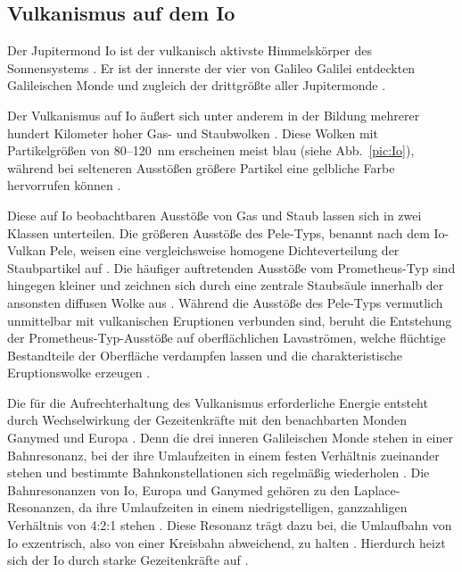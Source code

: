 \documentclass[a4paper,11pt]{article}
\newcommand{\mysubsection}[1]{\subsection{#1}\label{subsec:#1}}
\begin{document}
\mysubsection{Vulkanismus auf dem Io}

Der Jupitermond Io ist der vulkanisch aktivste Himmelskörper des Sonnensystems \parencite[1]{Prajan_2025}.
Er ist der innerste der vier von Galileo Galilei entdeckten Galileischen Monde
und zugleich der drittgrößte aller Jupitermonde \parencite[1]{Prajan_2025}.

Der Vulkanismus auf Io äußert sich unter anderem in der Bildung mehrerer hundert Kilometer hoher
Gas- und Staubwolken \parencite[505, 509, 517]{Geissler_2008}.
Diese Wolken mit Partikelgrößen von 80--120~nm erscheinen meist blau (siehe Abb.~\ref{pic:Io}),
während bei selteneren Ausstößen größere Partikel eine gelbliche Farbe hervorrufen können \parencite[513, 514]{Geissler_2008}.

Diese auf Io beobachtbaren Ausstöße von Gas und Staub lassen sich in zwei Klassen unterteilen.
Die größeren Ausstöße des Pele-Typs, benannt nach dem Io-Vulkan Pele,
weisen eine vergleichsweise homogene Dichteverteilung der Staubpartikel auf \parencite[506, 507]{Geissler_2008}.
Die häufiger auftretenden Ausstöße vom Prometheus-Typ sind hingegen kleiner und
zeichnen sich durch eine zentrale Staubsäule innerhalb der ansonsten diffusen Wolke aus \parencite[506, 507]{Geissler_2008}.
Während die Ausstöße des Pele-Typs vermutlich unmittelbar mit vulkanischen Eruptionen verbunden sind,
beruht die Entstehung der Prometheus-Typ-Ausstöße auf oberflächlichen Lavaströmen,
welche flüchtige Bestandteile der Oberfläche verdampfen lassen und
die charakteristische Eruptionswolke erzeugen \parencite[240]{Spencer_2007}.

Die für die Aufrechterhaltung des Vulkanismus erforderliche Energie entsteht
durch Wechselwirkung der Gezeitenkräfte mit den benachbarten Monden Ganymed und Europa \parencite[1]{Kleer_2024}.
Denn die drei inneren Galileischen Monde stehen in einer Bahnresonanz,
bei der ihre Umlaufzeiten in einem festen Verhältnis zueinander stehen und
bestimmte Bahnkonstellationen sich regelmäßig wiederholen \parencites[1]{Kleer_2024}[1]{Veenstra_2026}.
Die Bahnresonanzen von Io, Europa und Ganymed gehören zu den Laplace-Resonanzen,
da ihre Umlaufzeiten in einem niedrigstelligen, ganzzahligen Verhältnis von 4:2:1 stehen \parencite[1]{Veenstra_2026}.
Diese Resonanz trägt dazu bei, die Umlaufbahn von Io exzentrisch,
also von einer Kreisbahn abweichend, zu halten \parencite[1]{Veenstra_2026}.
Hierdurch heizt sich der Io durch starke Gezeitenkräfte auf \parencite[1]{Kleer_2024}.
\end{document}
